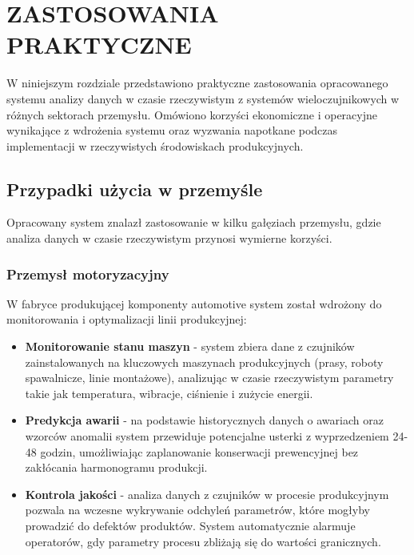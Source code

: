 \section{ZASTOSOWANIA PRAKTYCZNE}
\label{sec:zastosowania_praktyczne}

W niniejszym rozdziale przedstawiono praktyczne zastosowania opracowanego systemu analizy danych w czasie rzeczywistym z systemów wieloczujnikowych w różnych sektorach przemysłu. Omówiono korzyści ekonomiczne i operacyjne wynikające z wdrożenia systemu oraz wyzwania napotkane podczas implementacji w rzeczywistych środowiskach produkcyjnych.

\subsection{Przypadki użycia w przemyśle}
\label{subsec:przypadki_uzycia}

Opracowany system znalazł zastosowanie w kilku gałęziach przemysłu, gdzie analiza danych w czasie rzeczywistym przynosi wymierne korzyści.

\subsubsection{Przemysł motoryzacyjny}
\label{subsubsec:przemysl_motoryzacyjny}

W fabryce produkującej komponenty automotive system został wdrożony do monitorowania i optymalizacji linii produkcyjnej:

\begin{itemize}
    \item \textbf{Monitorowanie stanu maszyn} - system zbiera dane z czujników zainstalowanych na kluczowych maszynach produkcyjnych (prasy, roboty spawalnicze, linie montażowe), analizując w czasie rzeczywistym parametry takie jak temperatura, wibracje, ciśnienie i zużycie energii.
    \item \textbf{Predykcja awarii} - na podstawie historycznych danych o awariach oraz wzorców anomalii system przewiduje potencjalne usterki z wyprzedzeniem 24-48 godzin, umożliwiając zaplanowanie konserwacji prewencyjnej bez zakłócania harmonogramu produkcji.
    \item \textbf{Kontrola jakości} - analiza danych z czujników w procesie produkcyjnym pozwala na wczesne wykrywanie odchyleń parametrów, które mogłyby prowadzić do defektów produktów. System automatycznie alarmuje operatorów, gdy parametry procesu zbliżają się do wartości granicznych.
\end{itemize}

